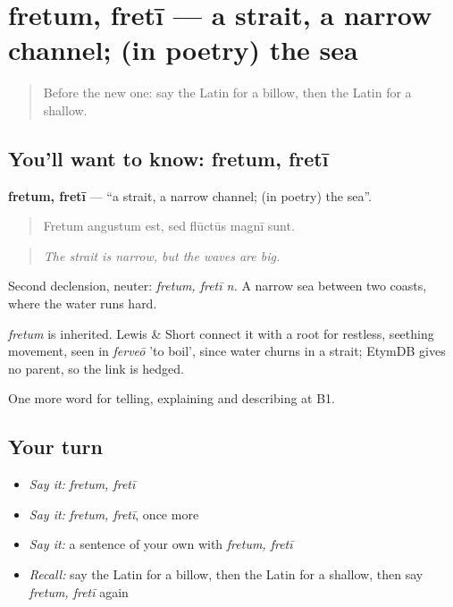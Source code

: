 \section[fretum, fretī]{fretum, fretī — a strait, a narrow channel; (in poetry) the sea}

\label{lesson:LA-C443-fretum}



\begin{quote}
Before the new one: say the Latin for a billow, then the Latin for a shallow.
\end{quote}

\subsection*{You'll want to know: fretum, fretī}
\textbf{fretum, fretī} — \textquotedblleft{}a strait, a narrow channel; (in poetry) the sea\textquotedblright{}.

\begin{quote}
Fretum angustum est, sed flūctūs magnī sunt.
\end{quote}

\begin{quote}
\emph{The strait is narrow, but the waves are big.}
\end{quote}

Second declension, neuter: \emph{fretum, fretī n.} A narrow sea between two coasts, where the water runs hard.

\begin{cousinweb}
\emph{fretum} is inherited. Lewis \& Short connect it with a root for restless, seething movement, seen in \emph{ferveō} 'to boil', since water churns in a strait; EtymDB gives no parent, so the link is hedged.
\end{cousinweb}

\begin{grammarlens}[title={What you've built}]
One more word for telling, explaining and describing at B1.
\end{grammarlens}

\subsection*{Your turn}
\begin{itemize}
\raggedright
  \item \emph{Say it:} \emph{fretum, fretī}
  \item \emph{Say it:} \emph{fretum, fretī}, once more
  \item \emph{Say it:} a sentence of your own with \emph{fretum, fretī}
  \item \emph{Recall:} say the Latin for a billow, then the Latin for a shallow, then say \emph{fretum, fretī} again
\end{itemize}

